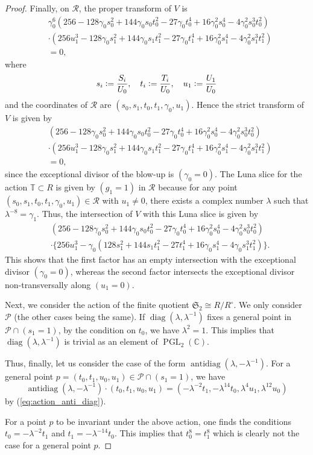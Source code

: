 \documentclass[12pt, pdftex]{amsart}
\theoremstyle{plain}
\theoremstyle{definition}
\numberwithin{equation}{section}
\def\C{{\mathbb C}}
\def\SS{{\mathfrak S}}
\def\diag{\mathop{\mathrm{diag}}\nolimits}
\def\antidiag{\mathop{\mathrm{antidiag}}\nolimits}
\def\g{\mathfrak{g}}
\def\PP{\mathcal{P}}
\def\RR{\mathcal{R}}
\def\g{\gamma}
\def\PGL{\mathop{\mathrm{PGL}}\nolimits}
\newcommand{\defeq}{\vcentcolon=}
\begin{document}
\begin{proof}
Finally, on $\RR$, the proper transform of $V$ is 
\begin{align*}
    &\g_0^6(256-128\g_0s_0^2+144\g_0s_0t_0^2-27\g_0t_0^4+16\g_0^2s_0^4-4\g_0^2s_0^3t_0^2)\\
    &\cdot(256u_1^3-128\g_0s_1^2+144\g_0s_1t_1^2-27\g_0t_1^4+16\g_0^2s_1^4-4\g_0^2s_1^3t_1^2)\\
    &=0,
\end{align*}
where
\[s_i\defeq\frac{S_i}{U_0},\quad t_i\defeq\frac{T_i}{U_0},\quad u_1\defeq\frac{U_1}{U_0}\]
and the coordinates of $\RR$ are $(s_0,s_1,t_0,t_1,\g_0,u_1)$.
Hence the strict transform of $V$ is given by 
\begin{align*}
    &(256-128\g_0s_0^2+144\g_0s_0t_0^2-27\g_0t_0^4+16\g_0^2s_0^4-4\g_0^2s_0^3t_0^2)\\
    &\cdot(256u_1^3-128\g_0s_1^2+144\g_0s_1t_1^2-27\g_0t_1^4+16\g_0^2s_1^4-4\g_0^2s_1^3t_1^2)\\
    &=0,
\end{align*}
since the exceptional divisor of the blow-up is $(\g_0=0)$.
The Luna slice for the action $\mathbb{T}\subset R$ is given by $(g_1=1)$ in $\RR$ because for any point $(s_0,s_1,t_0,t_1,\g_0,u_1)\in\RR$ with $u_1\neq 0$, there exists a complex number $\lambda$ such that $\lambda^{-8}=\g_1$.
Thus, the intersection of $V$ with this Luna slice is given by 
\begin{align*}
    &(256-128\g_0s_0^2+144\g_0s_0t_0^2-27\g_0t_0^4+16\g_0^2s_0^4-4\g_0^2s_0^3t_0^2)\\
    &\cdot\{256u_1^3-\g_0(128s_1^2+144s_1t_1^2-27t_1^4+16\g_0s_1^4-4\g_0s_1^3t_1^2)\}.
\end{align*}
This shows that the first factor has an empty intersection with the exceptional divisor $(\g_0=0)$, whereas the second factor intersects the exceptional divisor non-transversally along $(u_1=0)$.

Next, we consider the action of the finite quotient $\SS_2\cong R/R^{\circ}$.
We only consider $\PP$ (the other cases being the same).
If $\diag(\lambda,\lambda^{-1})$ fixes a general point in $\PP\cap(s_1=1)$, by the condition on $t_0$, we have $\lambda^2=1$.
This implies that $\diag(\lambda,\lambda^{-1})$ is trivial as an element of $\PGL_2(\C)$.

Thus, finally, let us consider the case of the form $\antidiag(\lambda,-\lambda^{-1})$.
For a general point $p=(t_0,t_1,u_0,u_1)\in\PP\cap(s_1=1)$, we have 
\[\antidiag(\lambda,-\lambda^{-1})\cdot(t_0,t_1,u_0,u_1)=(-\lambda^{-2}t_1,-\lambda^{14}t_0, \lambda^4u_1,\lambda^{12}u_0)\]
by (\ref{eq:action_anti_diag}).

For a point $p$ to be invariant under the above action, one finds the conditions $t_0=-\lambda^{-2}t_1$ and $t_1=-\lambda^{-14}t_0$.
This implies that $t_0^8=t_1^8$ which is clearly not the case for a general point $p$.
\end{proof}
\end{document}
